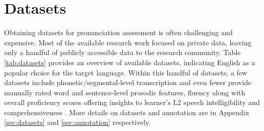 \documentclass[11pt]{article}
\begin{document}







\section{Datasets}

Obtaining datasets for pronunciation assessment is often challenging and expensive. Most of the available research work focused on private data, leaving only a handful of publicly accessible data to the research community. Table \ref{tab:datasets} provides an overview of available datasets, indicating English as a popular choice for the target language. Within this handful of datasets, a few datasets include phonetic/segmental-level transcription and even fewer provide manually rated word and sentence-level prosodic features, fluency along with overall proficiency scores offering insights to learner's L2 speech intelligibility and comprehensiveness \cite{arvaniti2000greek, singa, cole2017crowd, speechocean762}. More details on datasets and annotation are in Appendix \ref{sec:datasets} and \ref{sec:annotation} respectively.
\end{document}

